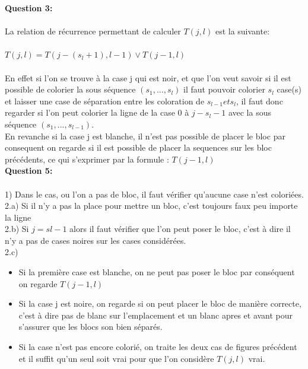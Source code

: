\documentclass[a4paper]{memoir}
\begin{document}
 	\textbf{Question 3:}\\\\
 	La relation de récurrence permettant de calculer $T(j,l)$ est la suivante:\\\\
 	$T(j, l) = T(j-(s_{l}+1),l-1) \vee T(j-1,l)$\\\\
 	En effet si l'on se trouve à la case j qui est noir, et que l'on veut savoir si il est possible de colorier la sous séquence $(s_{1}, ..., s_{l})$ il faut pouvoir colorier $s_{l}$ case(s) et laisser une case de séparation entre les coloration de $s_{l-1} et s_{l}$, il faut donc regarder si l'on peut colorier la ligne de la case 0 à $j - s_{l} - 1$ avec la sous séquence $(s_{1}, ..., s_{l-1})$. \\
        En revanche si la case j est blanche, il n'est pas possible de placer le bloc par consequent on regarde si il est possible de placer la sequences sur les bloc précédents, ce qui s'exprimer par la formule : $T(j-1,l)$ \\


        \textbf{Question 5:}\\\\
        1) Dans le cas, ou l'on a pas de bloc, il faut vérifier qu'aucune case n'est coloriées.\\
        2.a) Si il n'y a pas la place pour mettre un bloc, c'est toujours faux peu importe la ligne \\
        2.b) Si $j = sl-1$ alors il faut vérifier que l'on peut poser le bloc, c'est à dire il n'y a pas de cases noires sur les cases considérées. \\
        2.c) \begin{itemize}
        \item Si la première case est blanche, on ne peut pas poser le bloc par conséquent on regarde $T(j-1,l)$
        \item Si la case j est noire, on regarde si on peut placer le bloc de manière correcte, c'est à dire pas de blanc sur l'emplacement et un blanc apres et avant pour s'assurer que les blocs son bien séparés.
        \item Si la case n'est pas encore colorié, on traite les deux cas de figures précédent et il suffit qu'un seul soit vrai pour que l'on considère $T(j,l)$ vrai.
          \end{itemize}
 
\end{document}

